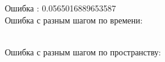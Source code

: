 \documentclass[12pt]{article}
\begin{document}
\begin{enumerate}
        Ошибка : 0.0565016889653587
        \\  Ошибка с разным шагом по времени:
        \begin{figure}[h]
            \label{ris:image}
        \end{figure}\\
        \newpage
        Ошибка с разным шагом по пространству:
        \begin{figure}[h]
            \label{ris:image}
        \end{figure}\\
        

\end{enumerate}
\end{document}
